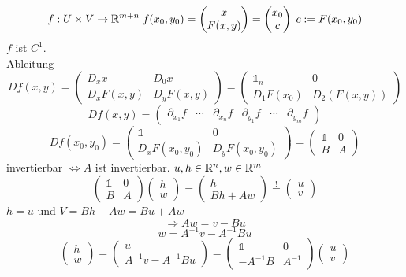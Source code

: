 \documentclass[../ana2.tex]{subfiles}
\begin{document}
\[ f:U\times V\rightarrow \mathbb{R}^{m+n} \; f(x_0, y_0) =  
\begin{pmatrix} x \\ F(x,y)\end{pmatrix} = 
\begin{pmatrix} x_0 \\ c\end{pmatrix} \; c:=F(x_0,y_0)\]
\(f\) ist \(C^1\).\\
Ableitung \[ Df(x,y) = \begin{pmatrix}
    D_x x & D_0 x \\
    D_x F(x,y) & D_y F(x,y)
\end{pmatrix}  = \begin{pmatrix}
    \mathds{1}_n & 0 \\
    D_1F(x_0) & D_2(F(x,y))
\end{pmatrix} \]
\[ Df(x,y) = \begin{pmatrix} 
    \partial_{x_1} f & \cdots & \partial_{x_n} f & \partial_{y_1}f & \cdots & \partial_{y_m}f
\end{pmatrix}\]
\[ Df(x_0, y_0) = \begin{pmatrix}
    \mathds{1} & 0 \\
    D_x F(x_0, y_0) & D_y F(x_0, y_0)
\end{pmatrix} = \begin{pmatrix}
    \mathds{1} & 0 \\
    B & A
\end{pmatrix} \]
invertierbar \(\Leftrightarrow A\) ist invertierbar.
\( u, h \in \mathbb{R}^n, w \in \mathbb{R}^m \)
\[ \begin{pmatrix}
    \mathds{1} & 0\\
    B & A
\end{pmatrix} \begin{pmatrix}
    h \\
    w
\end{pmatrix} = \begin{pmatrix}
    h \\
    Bh + Aw
\end{pmatrix} \overset{!}{=} \begin{pmatrix}
    u \\ 
    v
\end{pmatrix}\]
\(h = u \) und \( V = Bh + Aw = Bu + Aw \)
\[ \Rightarrow Aw = v - Bu \]
\[ w = A^{-1} v - A^{-1} Bu \]
\[ \begin{pmatrix}
    h \\ w
\end{pmatrix} = \begin{pmatrix}
    u \\ A^{-1} v - A^{-1} Bu
\end{pmatrix} = \begin{pmatrix}
    \mathds{1} & 0 \\ 
    -A^{-1}B & A^{-1}
\end{pmatrix}\begin{pmatrix}
    u \\ v
\end{pmatrix} \]
\end{document}
